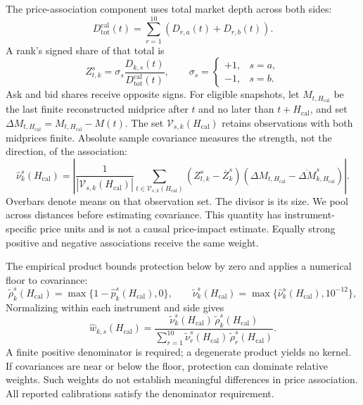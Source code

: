 The price-association component uses total market depth across both sides:
\begin{equation}
    D_{\mathrm{tot}}^{\mathrm{cal}}(t)
    =
    \sum_{r=1}^{10}\left(D_{r,a}(t)+D_{r,b}(t)\right).
    \label{eq:total_topn_market_depth}
\end{equation}
A rank's signed share of that total is
\begin{equation}
    Z^{s}_{t,k}
    =
    \sigma_s\frac{D_{k,s}(t)}{D_{\mathrm{tot}}^{\mathrm{cal}}(t)},
    \qquad
    \sigma_s= \begin{cases}
        +1, & s=a,\\
        -1, & s=b.
    \end{cases}
    \label{eq:normalized_level_contribution}
\end{equation}
Ask and bid shares receive opposite signs. For eligible snapshots, let $M_{t,H_{\mathrm{cal}}}$ be the last finite reconstructed midprice after $t$ and no later than $t+H_{\mathrm{cal}}$, and set $\Delta M_{t,H_{\mathrm{cal}}}=M_{t,H_{\mathrm{cal}}}-M(t)$. The set $\mathcal V_{s,k}(H_{\mathrm{cal}})$ retains observations with both midprices finite. Absolute sample covariance measures the strength, not the direction, of the association:
\begin{equation}
    \widehat\nu^{s}_{k}(H_{\mathrm{cal}})
    =
    \left|
        \frac{1}{|\mathcal{V}_{s,k}(H_{\mathrm{cal}})|}
        \sum_{t\in\mathcal{V}_{s,k}(H_{\mathrm{cal}})}
        \left(Z^{s}_{t,k}-\overline Z^{s}_{k}\right)
        \left(\Delta M_{t,H_{\mathrm{cal}}}-\overline{\Delta M}^{s}_{k,H_{\mathrm{cal}}}\right)
    \right|.
    \label{eq:empirical_visibility_covariance}
\end{equation}
Overbars denote means on that observation set. The divisor is its size. We pool across distances before estimating covariance. This quantity has instrument-specific price units and is not a causal price-impact estimate. Equally strong positive and negative associations receive the same weight.

The empirical product bounds protection below by zero and applies a numerical floor to covariance:
\begin{equation}
    \widetilde\rho^{s}_{k}(H_{\mathrm{cal}})=\max\{1-\widehat p^{s}_{k}(H_{\mathrm{cal}}),0\},
    \qquad
    \widetilde\nu^{s}_{k}(H_{\mathrm{cal}})=\max\{\widehat\nu^{s}_{k}(H_{\mathrm{cal}}),10^{-12}\},
    \label{eq:empirical_kernel_floors}
\end{equation}
Normalizing within each instrument and side gives
\begin{equation}
    \widehat w_{k,s}(H_{\mathrm{cal}})
    =
    \frac{
        \widetilde\nu^{s}_{k}(H_{\mathrm{cal}})\,\widetilde\rho^{s}_{k}(H_{\mathrm{cal}})
    }{
        \sum_{r=1}^{10}\widetilde\nu^{s}_{r}(H_{\mathrm{cal}})\,\widetilde\rho^{s}_{r}(H_{\mathrm{cal}})
    }.
    \label{eq:empirical_depth_kernel}
\end{equation}
A finite positive denominator is required; a degenerate product yields no kernel. If covariances are near or below the floor, protection can dominate relative weights. Such weights do not establish meaningful differences in price association. All reported calibrations satisfy the denominator requirement.

